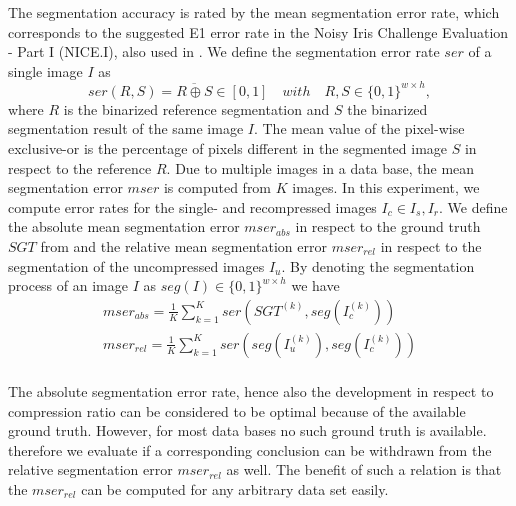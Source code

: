 \documentclass[10pt,twocolumn,letterpaper]{article}
\begin{document}


The segmentation accuracy is rated by the mean segmentation error rate, which corresponds to the suggested E1 error rate in the Noisy Iris Challenge Evaluation - Part I (NICE.I), also used in \cite{severeCompression}. We define the segmentation error rate $ser$ of a single image $I$ as
\begin{equation}
ser(R,S) = \overline{R \oplus S} \in [0,1]\quad with \quad R,S \in \{0,1\}^{w \times h},
\end{equation} where $R$ is the binarized reference segmentation and $S$ the binarized segmentation result of the same image $I$. The mean value of the pixel-wise exclusive-or is the percentage of pixels different in the segmented image $S$ in respect to the reference $R$. Due to multiple images in a data base, the mean segmentation error $mser$ is computed from $K$ images. In this experiment, we compute error rates for the single- and recompressed images $I_c \in {I_s, I_r}$. We define the absolute mean segmentation error $mser_{abs}$ in respect to the ground truth $SGT$ from \cite{severeCompression} and the relative mean segmentation error $mser_{rel}$ in respect to the segmentation of the uncompressed images $I_u$. By denoting the segmentation process of an image $I$ as $seg(I) \in \{0,1\}^{w \times h}$ we have
\begin{eqnarray}
mser_{abs} = \frac{1}{K}\sum_{k=1}^{K}ser(SGT^{(k)},seg(I_c^{(k)})) \label{equ:mserabs} \\
mser_{rel} = \frac{1}{K}\sum_{k=1}^{K}ser(seg(I_u^{(k)}),seg(I_c^{(k)})) \label{equ:mserrel} \\
\end{eqnarray}

The absolute segmentation error rate, hence also the development in respect to compression ratio can be considered to be optimal because of the available ground truth. However, for most data bases no such ground truth is available. therefore we evaluate if a corresponding conclusion can be withdrawn from the relative segmentation error $mser_{rel}$ as well. The benefit of such a relation is that the $mser_{rel}$ can be computed for any arbitrary data set easily. 
\end{document}
